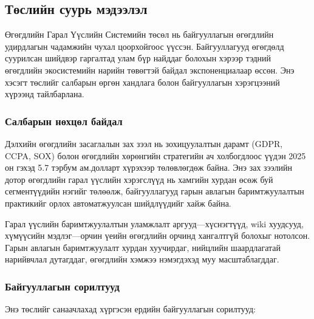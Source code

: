 \subsection{Төслийн суурь мэдээлэл}
\label{subsec:dl_background}

Өгөгдлийн Гарал Үүслийн Системийн төсөл нь байгууллагын өгөгдлийн удирдлагын чадамжийн чухал цоорхойгоос үүссэн. Байгууллагууд өгөгдөлд суурилсан шийдвэр гаргалтад улам бүр найддаг болохын хэрээр тэдний өгөгдлийн экосистемийн нарийн төвөгтэй байдал экспоненциалаар өссөн. Энэ хэсэгт төслийг салбарын өргөн хандлага болон байгууллагын хэрэгцээний хүрээнд тайлбарлана.

\subsubsection{Салбарын нөхцөл байдал}

Дэлхийн өгөгдлийн засаглалын зах зээл нь зохицуулалтын дарамт (GDPR, CCPA, SOX) болон өгөгдлийн хөрөнгийн стратегийн ач холбогдлоос үүдэн 2025 он гэхэд 5.7 тэрбум ам.долларт хүрэхээр төлөвлөгдөж байна. Энэ зах зээлийн дотор өгөгдлийн гарал үүслийн хэрэгслүүд нь хамгийн хурдан өсөж буй сегментүүдийн нэгийг төлөөлж, байгууллагууд гарын авлагын баримтжуулалтын практикийг орлох автоматжуулсан шийдлүүдийг хайж байна.

Гарал үүслийн баримтжуулалтын уламжлалт аргууд---хүснэгтүүд, wiki хуудсууд, хүмүүсийн мэдлэг---орчин үеийн өгөгдлийн орчинд хангалтгүй болохыг нотолсон. Гарын авлагын баримтжуулалт хурдан хуучирдаг, нийцлийн шаардлагатай нарийвчлал дутагддаг, өгөгдлийн хэмжээ нэмэгдэхэд муу масштаблагддаг.

\subsubsection{Байгууллагын сорилтууд}

Энэ төслийг санаачлахад хүргэсэн ердийн байгууллагын сорилтууд:

